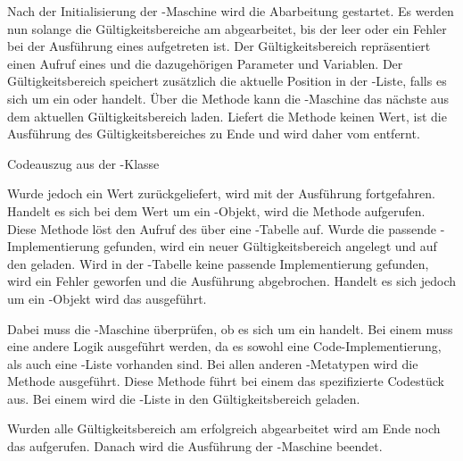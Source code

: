 \SuperPar
Nach der Initialisierung der -Maschine wird die Abarbeitung gestartet. Es werden nun solange die Gültigkeitsbereiche am  abgearbeitet, bis der  leer oder ein Fehler bei der Ausführung eines  aufgetreten ist. Der Gültigkeitsbereich repräsentiert einen Aufruf eines  und die dazugehörigen Parameter und Variablen. Der Gültigkeitsbereich speichert zusätzlich die aktuelle Position in der -Liste, falls es sich um ein  oder  handelt. Über die Methode  kann die -Maschine das nächste  aus dem aktuellen Gültigkeitsbereich laden. Liefert die Methode keinen Wert, ist die Ausführung des Gültigkeitsbereiches zu Ende und wird daher vom  entfernt.

\begin{program}

\caption{Codeauszug aus der -Klasse}
\label{prog:runtime}
\end{program}

\SuperPar
Wurde jedoch ein Wert zurückgeliefert, wird mit der Ausführung fortgefahren. Handelt es sich bei dem Wert um ein -Objekt, wird die Methode  aufgerufen. Diese Methode löst den Aufruf des  über eine -Tabelle auf. Wurde die passende -Implementierung gefunden, wird ein neuer Gültigkeitsbereich angelegt und auf den  geladen. Wird in der -Tabelle keine passende Implementierung gefunden, wird ein Fehler geworfen und die Ausführung abgebrochen. Handelt es sich jedoch um ein -Objekt wird das  ausgeführt.  

\SuperPar
Dabei muss die -Maschine überprüfen, ob es sich um ein  handelt. Bei einem  muss eine andere Logik ausgeführt werden, da es sowohl eine Code-Implementierung, als auch eine -Liste vorhanden sind. Bei allen anderen -Metatypen wird die Methode  ausgeführt. Diese Methode führt bei einem  das spezifizierte Codestück aus. Bei einem  wird die -Liste in den Gültigkeitsbereich geladen.

\SuperPar
Wurden alle Gültigkeitsbereich am  erfolgreich abgearbeitet wird am Ende noch das  aufgerufen. Danach wird die Ausführung der -Maschine beendet.

